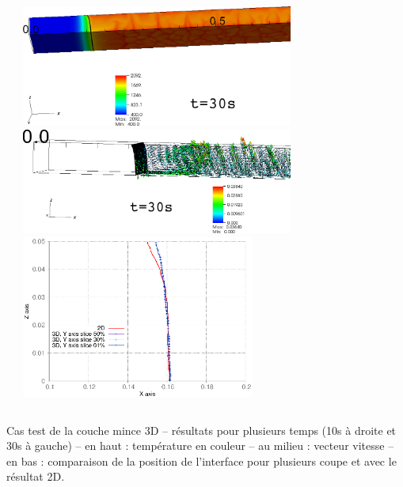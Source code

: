 \documentclass{beamer}
\begin{document}
\begin{frame}
\begin{columns}[c]
\begin{column}{0.5 \textwidth}
\begin{center}
\end{center}
\end{column}
    \begin{column}{0.5 \textwidth}
\begin{center}
\includegraphics[width=0.7\textwidth]{./Figures/CoucheMinceTEMP0300001.png}\\
\hspace{-0.8cm}
\includegraphics[width=0.7\textwidth]{./Figures/CoucheMinceVIT0300000.png}\\
\includegraphics[width=0.6\textwidth]{./Figures/Yslice_30s.eps}


\end{center}
   \end{column}
   \end{columns}
\center Cas test de la couche mince 3D -- résultats pour plusieurs temps (10s à droite et 30s à gauche) -- en haut : température en couleur -- au milieu : vecteur vitesse  -- en bas : comparaison de la position de l'interface pour plusieurs coupe et avec le résultat 2D.


\end{frame}


\end{document}
